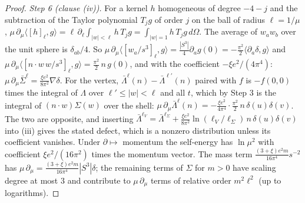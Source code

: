 \begin{proof}
\emph{Step 6 (clause (iv)).} For a kernel $h$ homogeneous of degree $-4 - j$ and the subtraction of the Taylor polynomial $T_{j}g$ of order $j$ on the ball of radius $\ell = 1/\mu$, $\mu\,\partial_{\mu}\langle[h]_{\ell},g\rangle = \ell\,\partial_{\ell}\int_{|w| < \ell}h\,T_{j}g = \int_{|w| = 1}h\,T_{j}g\,d\Omega$. The average of $w_{a}w_{b}$ over the unit sphere is $\delta_{ab}/4$. So $\mu\,\partial_{\mu}\langle[w_{a}/s^{3}]_{\ell},g\rangle = \frac{|S^{3}|}{4}\partial_{a}g(0) = -\frac{\pi^{2}}{2}\langle\partial_{a}\delta,g\rangle$ and $\mu\,\partial_{\mu}\langle[n\cdot w\,w/s^{3}]_{\ell},g\rangle = \frac{\pi^{2}}{2}\,n\,g(0)$, and with the coefficient $-\xi e^{2}/(4\pi^{4})$: $\mu\,\partial_{\mu}\bar\Sigma^{\ell} = \frac{\xi e^{2}}{8\pi^{2}}\nabla\delta$. For the vertex, $\bar\Lambda^{\ell}(n) - \bar\Lambda^{\ell'}(n)$ paired with $f$ is $-f(0,0)$ times the integral of $\Lambda$ over $\ell' \le |w| < \ell$ and all $t$, which by Step 3 is the integral of $(n\cdot w)\Sigma(w)$ over the shell: $\mu\,\partial_{\mu}\bar\Lambda^{\ell}(n) = -\frac{\xi e^{2}}{4\pi^{4}}\cdot\frac{\pi^{2}}{2}\,n\,\delta(u)\delta(v)$. The two are opposite, and inserting $\bar\Lambda^{\ell_{V}} = \bar\Lambda^{\ell_{\Sigma}} + \frac{\xi e^{2}}{8\pi^{2}}\ln(\ell_{V}/\ell_{\Sigma})\,n\,\delta(u)\delta(v)$ into (iii) gives the stated defect, which is a nonzero distribution unless its coefficient vanishes. Under $\partial \mapsto$ momentum the self-energy has $\ln\mu^{2}$ with coefficient $\xi e^{2}/(16\pi^{2})$ times the momentum vector. The mass term $\frac{(3+\xi)e^{2}m}{16\pi^{4}}s^{-2}$ has $\mu\,\partial_{\mu} = \frac{(3+\xi)e^{2}m}{16\pi^{4}}|S^{3}|\delta$; the remaining terms of $\Sigma$ for $m > 0$ have scaling degree at most $3$ and contribute to $\mu\,\partial_{\mu}$ terms of relative order $m^{2}\ell^{2}$ (up to logarithms).


\end{proof}
